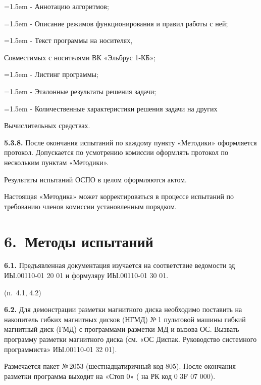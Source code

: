\documentclass[11pt,a4paper]{article}
\begin{document}
\par\hangindent=1.5em - Аннотацию алгоритмов;\par
\par\hangindent=1.5em - Описание режимов функционирования и правил работы с ней;\par
\par\hangindent=1.5em - Текст программы на носителях,\par
Совместимых с носителями ВК «Эльбрус 1-КБ»;

\par\hangindent=1.5em - Листинг программы;\par
\par\hangindent=1.5em - Эталонные результаты решения задачи;\par
\par\hangindent=1.5em - Количественные характеристики решения задачи на других\par
Вычислительных средствах.

\par\textbf{5.3.8.} После окончания испытаний по каждому пункту «Методики» оформляется протокол. Допускается по усмотрению комиссии оформлять протокол по нескольким пунктам «Методики».\par
Результаты испытаний ОСПО в целом оформляются актом.

Настоящая «Методика» может корректироваться в процессе испытаний по требованию членов комиссии установленным порядком.

\section*{6.~Методы испытаний}
\par\textbf{6.1.} Предъявленная документация изучается на соответствие ведомости эд ИЫ.00110-01 20 01 и формуляру ИЫ.00110-01 30 01.\par
\begin{center}(п.~4.1, 4.2)\end{center}
\par\textbf{6.2.} Для демонстрации разметки магнитного диска необходимо поставить на накопитель гибких магнитных дисков (НГМД) №\,1 пультовой машины гибкий магнитный диск (ГМД) с программами разметки МД и вызова ОС. Вызвать программу разметки магнитного диска (см. «ОС Диспак. Руководство системного программиста» ИЫ.00110-01 32 01).\par
Размечается пакет №\,2053 (шестнадцатиричный код 805). После окончания разметки программа выходит на «Стоп 0» ( на РК код 0 3F 07 000).
\end{document}
